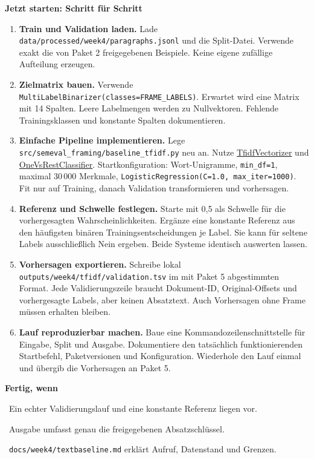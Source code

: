 \documentclass[10pt,a4paper]{article}
\newcommand{\checkbox}{\fbox{\rule{0pt}{2.4mm}\hspace{2.4mm}}}
\newcommand{\planheading}[1]{\par\vspace{9pt}\textbf{#1}\par\vspace{3pt}}
\newenvironment{startsteps}{\begin{enumerate}[leftmargin=12mm,label=\checkbox\hspace{2mm}\textbf{\arabic*.},labelsep=2mm,itemsep=7pt,parsep=2pt,topsep=4pt]}{\end{enumerate}}
\begin{document}
\planheading{Jetzt starten: Schritt für Schritt}
\begin{startsteps}
  \item \textbf{Train und Validation laden.}
    Lade \texttt{data/processed/week4/paragraphs.jsonl} und die Split-Datei.
    Verwende exakt die von Paket 2 freigegebenen Beispiele. Keine eigene zufällige Aufteilung erzeugen.
  \item \textbf{Zielmatrix bauen.}
    Verwende \texttt{MultiLabelBinarizer(classes=FRAME\_LABELS)}.
    Erwartet wird eine Matrix mit 14 Spalten. Leere Labelmengen werden zu Nullvektoren.
    Fehlende Trainingsklassen und konstante Spalten dokumentieren.
  \item \textbf{Einfache Pipeline implementieren.}
    Lege \texttt{src/semeval\_framing/baseline\_tfidf.py} neu an.
    Nutze \href{https://scikit-learn.org/stable/modules/generated/sklearn.feature_extraction.text.TfidfVectorizer.html}{TfidfVectorizer}
    und \href{https://scikit-learn.org/stable/modules/generated/sklearn.multiclass.OneVsRestClassifier.html}{OneVsRestClassifier}.
    Startkonfiguration: Wort-Unigramme, \texttt{min\_df=1}, maximal 30\,000 Merkmale,
    \texttt{LogisticRegression(C=1.0, max\_iter=1000)}.
    Fit nur auf Training, danach Validation transformieren und vorhersagen.
  \item \textbf{Referenz und Schwelle festlegen.}
    Starte mit 0,5 als Schwelle für die vorhergesagten Wahrscheinlichkeiten.
    Ergänze eine konstante Referenz aus den häufigsten binären Trainingsentscheidungen je Label.
    Sie kann für seltene Labels ausschließlich Nein ergeben. Beide Systeme identisch auswerten lassen.
  \item \textbf{Vorhersagen exportieren.}
    Schreibe lokal \texttt{outputs/week4/tfidf/validation.tsv} im mit Paket 5 abgestimmten Format.
    Jede Validierungszeile braucht Dokument-ID, Original-Offsets und vorhergesagte Labels,
    aber keinen Absatztext. Auch Vorhersagen ohne Frame müssen erhalten bleiben.
  \item \textbf{Lauf reproduzierbar machen.}
    Baue eine Kommandozeilenschnittstelle für Eingabe, Split und Ausgabe.
    Dokumentiere den tatsächlich funktionierenden Startbefehl, Paketversionen und Konfiguration.
    Wiederhole den Lauf einmal und übergib die Vorhersagen an Paket 5.
\end{startsteps}

\planheading{Fertig, wenn}
\checkbox\ Ein echter Validierungslauf und eine konstante Referenz liegen vor.\par
\checkbox\ Ausgabe umfasst genau die freigegebenen Absatzschlüssel.\par
\checkbox\ \texttt{docs/week4/textbaseline.md} erklärt Aufruf, Datenstand und Grenzen.
\end{document}
